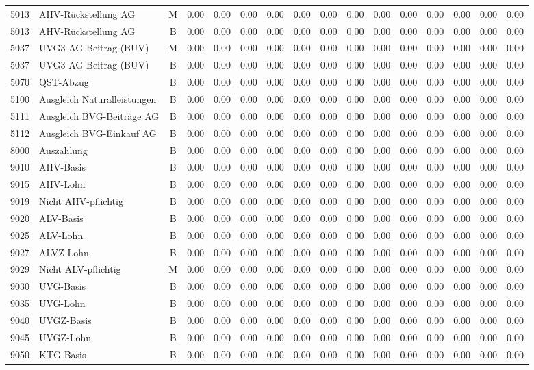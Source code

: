 \documentclass[8pt,a4paper]{extarticle}
\begin{document}
\begin{longtable}{@{\extracolsep{\fill}} l l c r r r r r r r r r r r r r}
5013&AHV-Rückstellung AG&M&0.00&0.00&0.00&0.00&0.00&0.00&0.00&0.00&0.00&0.00&0.00&0.00&0.00\\
5013&AHV-Rückstellung AG&B&0.00&0.00&0.00&0.00&0.00&0.00&0.00&0.00&0.00&0.00&0.00&0.00&0.00\\
5037&UVG3 AG-Beitrag (BUV)&M&0.00&0.00&0.00&0.00&0.00&0.00&0.00&0.00&0.00&0.00&0.00&0.00&0.00\\
5037&UVG3 AG-Beitrag (BUV)&B&0.00&0.00&0.00&0.00&0.00&0.00&0.00&0.00&0.00&0.00&0.00&0.00&0.00\\
5070&QST-Abzug&B&0.00&0.00&0.00&0.00&0.00&0.00&0.00&0.00&0.00&0.00&0.00&0.00&0.00\\
5100&Ausgleich Naturalleistungen&B&0.00&0.00&0.00&0.00&0.00&0.00&0.00&0.00&0.00&0.00&0.00&0.00&0.00\\
5111&Ausgleich BVG-Beiträge AG&B&0.00&0.00&0.00&0.00&0.00&0.00&0.00&0.00&0.00&0.00&0.00&0.00&0.00\\
5112&Ausgleich BVG-Einkauf AG&B&0.00&0.00&0.00&0.00&0.00&0.00&0.00&0.00&0.00&0.00&0.00&0.00&0.00\\
8000&Auszahlung&B&0.00&0.00&0.00&0.00&0.00&0.00&0.00&0.00&0.00&0.00&0.00&0.00&0.00\\
9010&AHV-Basis&B&0.00&0.00&0.00&0.00&0.00&0.00&0.00&0.00&0.00&0.00&0.00&0.00&0.00\\
9015&AHV-Lohn&B&0.00&0.00&0.00&0.00&0.00&0.00&0.00&0.00&0.00&0.00&0.00&0.00&0.00\\
9019&Nicht AHV-pflichtig&B&0.00&0.00&0.00&0.00&0.00&0.00&0.00&0.00&0.00&0.00&0.00&0.00&0.00\\
9020&ALV-Basis&B&0.00&0.00&0.00&0.00&0.00&0.00&0.00&0.00&0.00&0.00&0.00&0.00&0.00\\
9025&ALV-Lohn&B&0.00&0.00&0.00&0.00&0.00&0.00&0.00&0.00&0.00&0.00&0.00&0.00&0.00\\
9027&ALVZ-Lohn&B&0.00&0.00&0.00&0.00&0.00&0.00&0.00&0.00&0.00&0.00&0.00&0.00&0.00\\
9029&Nicht ALV-pflichtig&M&0.00&0.00&0.00&0.00&0.00&0.00&0.00&0.00&0.00&0.00&0.00&0.00&0.00\\
9030&UVG-Basis&B&0.00&0.00&0.00&0.00&0.00&0.00&0.00&0.00&0.00&0.00&0.00&0.00&0.00\\
9035&UVG-Lohn&B&0.00&0.00&0.00&0.00&0.00&0.00&0.00&0.00&0.00&0.00&0.00&0.00&0.00\\
9040&UVGZ-Basis&B&0.00&0.00&0.00&0.00&0.00&0.00&0.00&0.00&0.00&0.00&0.00&0.00&0.00\\
9045&UVGZ-Lohn&B&0.00&0.00&0.00&0.00&0.00&0.00&0.00&0.00&0.00&0.00&0.00&0.00&0.00\\
9050&KTG-Basis&B&0.00&0.00&0.00&0.00&0.00&0.00&0.00&0.00&0.00&0.00&0.00&0.00&0.00\\

\end{longtable}
\end{document}
